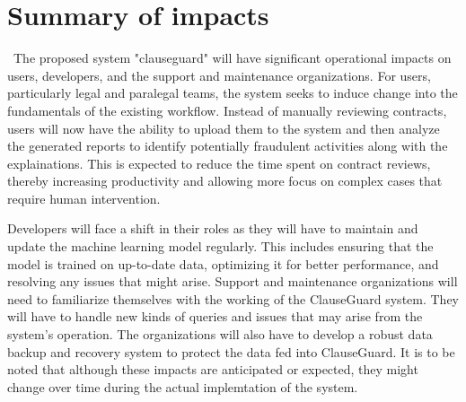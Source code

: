 \chapter{Summary of impacts \\
\label{Chapter::Summary of impacts}}\
The proposed system "clauseguard" will have significant operational impacts on users, developers, and the support and maintenance organizations. 
For users, particularly legal and paralegal teams, the system seeks to induce change into the fundamentals of the existing workflow. Instead of manually reviewing contracts, users will now have the ability to upload them to the system and then analyze the generated reports to identify potentially fraudulent activities along with the explainations. This is expected to reduce the time spent on contract reviews, thereby increasing productivity and allowing more focus on complex cases that require human intervention.

Developers will face a shift in their roles as they will have to maintain and update the machine learning model regularly. This includes ensuring that the model is trained on up-to-date data, optimizing it for better performance, and resolving any issues that might arise.
Support and maintenance organizations will  need to familiarize themselves with the working of the ClauseGuard system. They will have to handle new kinds of queries and issues that may arise from the system's operation. The organizations will also have to develop a robust data backup and recovery system to protect the data fed into ClauseGuard.
It is to be noted that although these impacts are anticipated or expected, they might change over time during the actual implemtation of the system.







